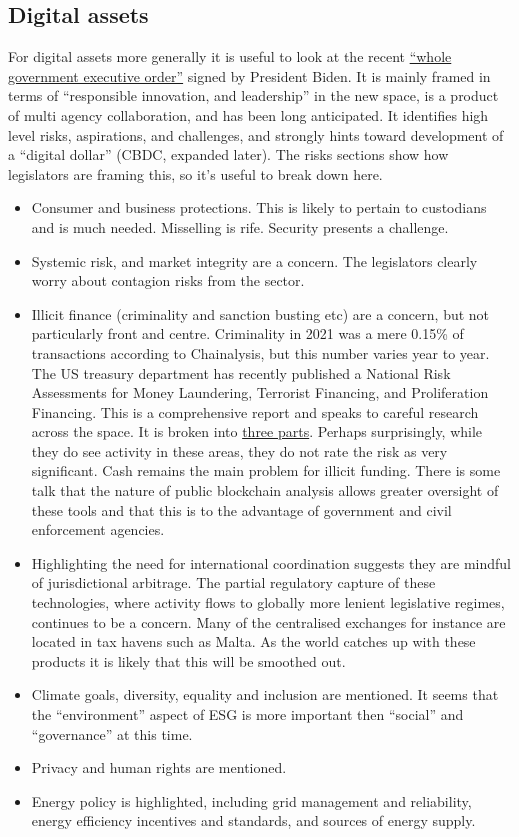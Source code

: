 \subsection{Digital assets}
For digital assets more generally it is useful to look at the recent \href{https://www.whitehouse.gov/briefing-room/presidential-actions/2022/03/09/executive-order-on-ensuring-responsible-development-of-digital-assets/}{``whole government executive order''} signed by President Biden. It is mainly framed in terms of ``responsible innovation, and leadership'' in the new space, is a product of multi agency collaboration, and has been long anticipated. It identifies high level risks, aspirations, and challenges, and strongly hints toward development of a ``digital dollar'' (CBDC, expanded later). The risks sections show how legislators are framing this, so it's useful to break down here.\par
\begin{itemize}
\item Consumer and business protections. This is likely to pertain to custodians and is much needed. Misselling is rife. Security presents a challenge.  
\item Systemic risk, and market integrity are a concern. The legislators clearly worry about contagion risks from the sector.
\item Illicit finance (criminality and sanction busting etc) are a concern, but not particularly front and centre\cite{moser2013inquiry}. Criminality in 2021 was a mere 0.15\% of transactions according to Chainalysis, but this number varies year to year. The US treasury department has recently published a National Risk Assessments for Money Laundering, Terrorist Financing, and Proliferation Financing. This is a comprehensive report and speaks to careful research across the space. It is broken into \href{https://home.treasury.gov/news/press-releases/jy0619}{three parts}. Perhaps surprisingly, while they do see activity in these areas, they do not rate the risk as very significant. Cash remains the main problem for illicit funding. There is some talk that the nature of public blockchain analysis allows greater oversight of these tools and that this is to the advantage of government and civil enforcement agencies.
\item Highlighting the need for international coordination suggests they are mindful of jurisdictional arbitrage. 
The partial regulatory capture of these technologies, where activity flows to globally more lenient legislative regimes, continues to be a concern. Many of the centralised exchanges for instance are located in tax havens such as Malta. As the world catches up with these products it is likely that this will be smoothed out.
\item Climate goals, diversity, equality and inclusion are mentioned. It seems that the ``environment'' aspect of ESG is more important then ``social'' and ``governance'' at this time.
\item Privacy and human rights are mentioned.
\item Energy policy is highlighted, including grid management and reliability, energy efficiency incentives and standards, and sources of energy supply.
\end{itemize}
